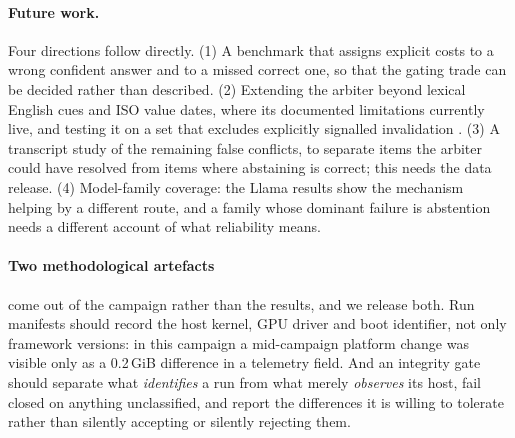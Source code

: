 \paragraph{Future work.} Four directions follow directly. (1) A benchmark that assigns explicit costs to a wrong
confident answer and to a missed correct one, so that the gating trade can be decided rather than described.
(2) Extending the arbiter beyond lexical English cues and ISO value dates, where its documented limitations
currently live, and testing it on a set that excludes explicitly signalled invalidation
\citep{chao2026stale}. (3) A transcript study of the remaining false conflicts, to separate items the arbiter
could have resolved from items where abstaining is correct; this needs the data release. (4) Model-family
coverage: the Llama results show the mechanism helping by a different route, and a family whose dominant failure
is abstention needs a different account of what reliability means.

\paragraph{Two methodological artefacts} come out of the campaign rather than the results, and we release both.
Run manifests should record the host kernel, GPU driver and boot identifier, not only framework versions: in this
campaign a mid-campaign platform change was visible only as a 0.2\,GiB difference in a telemetry field. And an
integrity gate should separate what \emph{identifies} a run from what merely \emph{observes} its host, fail closed
on anything unclassified, and report the differences it is willing to tolerate rather than silently accepting or
silently rejecting them.
